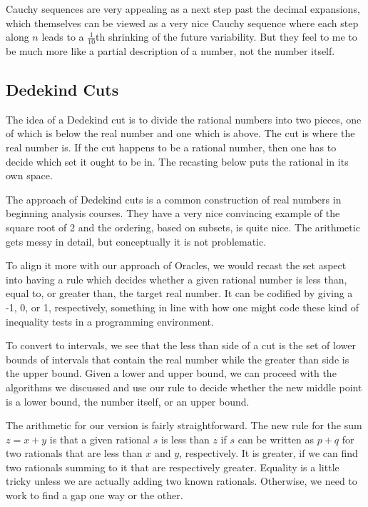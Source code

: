 \documentclass[12pt]{article}
\theoremstyle{remark}
\begin{document}
Cauchy sequences are very appealing as a next step past the decimal expansions, which themselves can be viewed as a very nice Cauchy sequence where each step along $n$ leads to a $\frac{1}{10}$th shrinking of the future variability. But they feel to me to be much more like a partial description of a number, not the number itself.
  
\subsection{Dedekind Cuts}

The idea of a Dedekind cut is to divide the rational numbers into two pieces, one of which is below the real number and one which is above. The cut is where the real number is. If the cut happens to be a rational number, then one has to decide which set it ought to be in. The recasting below puts the rational in its own space. 

The approach of Dedekind cuts is a common construction of real numbers in beginning analysis courses. They have a very nice convincing example of the square root of 2 and the ordering, based on subsets, is quite nice. The arithmetic gets messy in detail, but conceptually it is not problematic. 

To align it more with our approach of Oracles, we would recast the set aspect into having a rule which decides whether a given rational number is less than, equal to, or greater than, the target real number. It can be codified by giving a -1, 0, or 1,  respectively, something in line with how one might code these kind of inequality tests in a programming environment. 

To convert to intervals, we see that the less than side of a cut is the set of lower bounds of intervals that contain the real number while the greater than side is the upper bound. Given a lower and upper bound, we can proceed with the algorithms we discussed and use our rule to decide whether the new middle point is a lower bound, the number itself, or an upper bound. 

The arithmetic for our version is fairly straightforward. The new rule for the sum  $z = x+y$ is that a given rational $s$ is less than $z$ if $s$ can be written as $p+q$ for two rationals that are less than $x$ and $y$, respectively. It is greater, if we can find two rationals summing to it that are respectively greater. Equality is a little tricky unless we are actually adding two known rationals. Otherwise, we need to work to find a gap one way or the other. 
\end{document}
